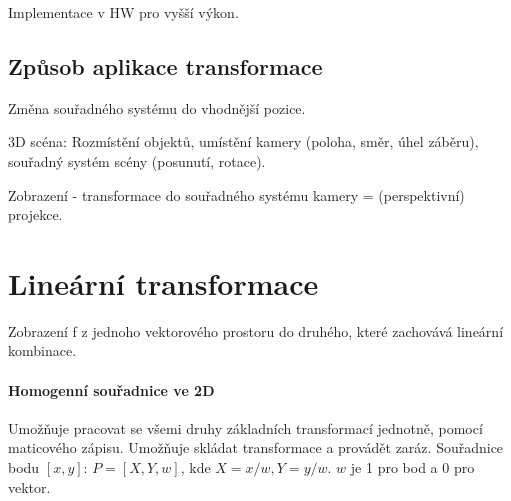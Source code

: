 \documentclass[a4paper, 11pt]{report}
\begin{document}
Implementace v HW pro vyšší výkon.

\subsection{Způsob aplikace transformace}
Změna souřadného systému do vhodnější pozice.

3D scéna: Rozmístění objektů, umístění kamery (poloha, směr, úhel záběru), souřadný systém scény (posunutí, rotace).

Zobrazení - transformace do souřadného systému kamery = (perspektivní) projekce.

\section{Lineární transformace}

Zobrazení f z jednoho vektorového prostoru do druhého, které zachovává lineární kombinace.

\paragraph{Homogenní souřadnice ve 2D}
Umožňuje pracovat se všemi druhy základních transformací jednotně, pomocí maticového zápisu. Umožňuje skládat transformace a provádět zaráz. Souřadnice bodu $[x, y]$: $P = [X, Y, w]$, kde $X = x/w, Y = y/w$. $w$ je 1 pro bod a 0 pro vektor.
\end{document}
